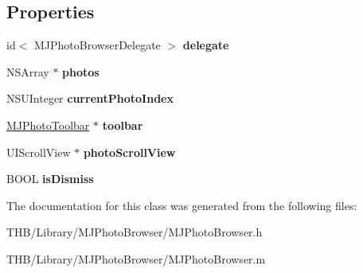 \subsection*{Properties}
\begin{DoxyCompactItemize}
\item 
\mbox{\label{interface_m_j_photo_browser_ac12e9d2281611fdf86dab0409b963928}} 
id$<$ M\+J\+Photo\+Browser\+Delegate $>$ {\bfseries delegate}
\item 
\mbox{\label{interface_m_j_photo_browser_ab28b7319ea753d31bed8388ae726a23c}} 
N\+S\+Array $\ast$ {\bfseries photos}
\item 
\mbox{\label{interface_m_j_photo_browser_a323c21e194a079db600a4bf836f3014b}} 
N\+S\+U\+Integer {\bfseries current\+Photo\+Index}
\item 
\mbox{\label{interface_m_j_photo_browser_a1e84856beb5078c57c74206c7c632b67}} 
\mbox{\hyperlink{interface_m_j_photo_toolbar}{M\+J\+Photo\+Toolbar}} $\ast$ {\bfseries toolbar}
\item 
\mbox{\label{interface_m_j_photo_browser_a16d495ad39b0184b2d295ca82ab57b69}} 
U\+I\+Scroll\+View $\ast$ {\bfseries photo\+Scroll\+View}
\item 
\mbox{\label{interface_m_j_photo_browser_a5b791c16ed19cdec79a182f27fa29ed2}} 
B\+O\+OL {\bfseries is\+Dismiss}
\end{DoxyCompactItemize}


The documentation for this class was generated from the following files\+:\begin{DoxyCompactItemize}
\item 
T\+H\+B/\+Library/\+M\+J\+Photo\+Browser/M\+J\+Photo\+Browser.\+h\item 
T\+H\+B/\+Library/\+M\+J\+Photo\+Browser/M\+J\+Photo\+Browser.\+m\end{DoxyCompactItemize}
